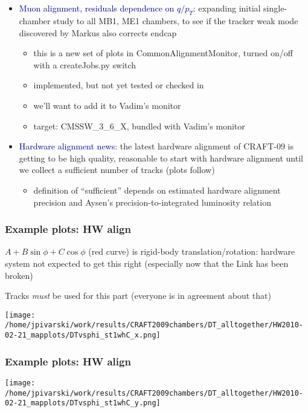 \documentclass[compress]{beamer}
\begin{document}
\begin{frame}
\frametitle{\mbox{ }}
\begin{itemize}\setlength{\itemsep}{0.5 cm}
\item \textcolor{darkblue}{Muon alignment, residuals dependence on
  $q/p_T$:} expanding initial single-chamber study to all MB1, ME1
  chambers, to see if the tracker weak mode discovered by Markus also
  corrects endcap
\begin{itemize}
\item this is a new set of plots in CommonAlignmentMonitor, turned
  on/off with a createJobs.py switch
\item implemented, but not yet tested or checked in
\item we'll want to add it to Vadim's monitor
\item target: CMSSW\_3\_6\_X, bundled with Vadim's monitor
\end{itemize}
\item \textcolor{darkblue}{Hardware alignment news:} the latest
  hardware alignment of CRAFT-09 is getting to be high quality,
  reasonable to start with hardware alignment until we collect
  a sufficient number of tracks (plots follow)
\begin{itemize}
\item definition of ``sufficient'' depends on estimated hardware
  alignment precision and Aysen's precision-to-integrated luminosity
  relation
\end{itemize}
\end{itemize}
\end{frame}

\begin{frame}
\frametitle{Example plots: HW align}

{\scriptsize
$A + B\sin\phi + C\cos\phi$ (red curve) is rigid-body
translation/rotation: hardware system not expected to get this right
(especially now that the Link has been broken)

Tracks {\it must} be used for this part (everyone is in agreement about that)}

\vfill
\texttt{[image: /home/jpivarski/work/results/CRAFT2009chambers/DT\_alltogether/HW2010-02-21\_mapplots/DTvsphi\_st1whC\_x.png]}

\end{frame}

\begin{frame}
\frametitle{Example plots: HW align}
\texttt{[image: /home/jpivarski/work/results/CRAFT2009chambers/DT\_alltogether/HW2010-02-21\_mapplots/DTvsphi\_st1whC\_y.png]}
\end{frame}
\end{document}
